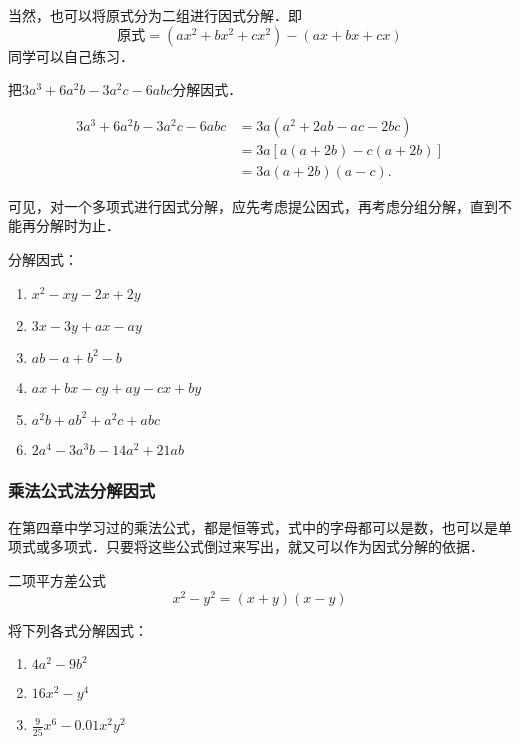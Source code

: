 当然，也可以将原式分为二组进行因式分解．即
\[\text{原式}=(ax^2+bx^2+cx^2)-(ax+bx+cx)\]
同学可以自己练习．

\begin{example}
    把$3a^3+6a^2b-3a^2c -6abc$分解因式．
\end{example}

\begin{solution}
    \[\begin{split}
        3a^3+6a^2b-3a^2c -6abc&=3a (a^2+2ab-ac-2bc)\\
    &=3a [a (a+2b) -c (a+2b) ]\\
    &=3a (a+2b) (a-c).
    \end{split}\]       
\end{solution}

可见，对一个多项式进行因式分解，应先考虑提公因式，再考虑分组分解，直到不能再分解时为止．

\begin{ex}
 分解因式：
 \begin{multicols}{2}
 \begin{enumerate}
     \item $x^2-xy-2x+2y$
     \item $3x-3y+ax-ay$
     \item $ab-a+b^2-b$
     \item $ax+bx-cy+ay-cx+by$
     \item $a^2b+ab^2+a^2c+abc$
     \item $2a^4-3a^3b-14a^2+21ab$
 \end{enumerate}  
\end{multicols}
\end{ex}

\subsubsection{乘法公式法分解因式}

在第四章中学习过的乘法公式，都是恒等式，式中的字母都可以是数，也可以是单项式或多项式．只要将这些公式倒过来写出，就又可以作为因式分解的依据．

\begin{blk}{二项平方差公式}
    \[x^2-y^2=(x+y)(x-y)\]
\end{blk}

\begin{example}
    将下列各式分解因式：
\begin{enumerate}
    \item $4a^2-9b^2$
    \item $16x^2-y^4$
    \item $\frac{9}{25}x^6-0.01 x^2y^2$
\end{enumerate}
\end{example}

